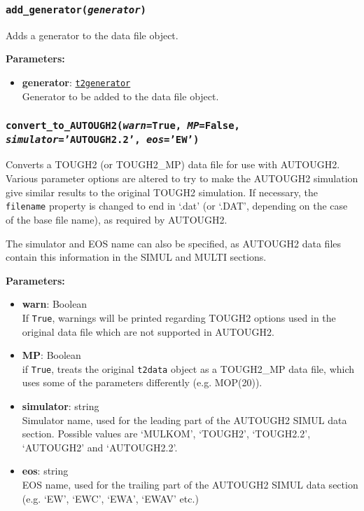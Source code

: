 \begin{snugshade}
\subsubsection{\texttt{add\_generator(\emph{generator})}}
\end{snugshade}
\label{sec:t2data:add_generator}

Adds a generator to the data file object.

\textbf{Parameters:}
\begin{itemize}
\item \textbf{generator}: \hyperref[t2generatorobjects]{\texttt{t2generator}}\\
  Generator to be added to the data file object.
\end{itemize}

\begin{snugshade}
\subsubsection{\texttt{convert\_to\_AUTOUGH2(\emph{warn}=True, \emph{MP}=False, \emph{simulator}='AUTOUGH2.2',\
    \emph{eos}='EW')}}
\end{snugshade}
\label{sec:t2data:convert_to_AUTOUGH2}

Converts a TOUGH2 (or TOUGH2\_MP) data file for use with AUTOUGH2.  Various parameter options are altered to try to make the AUTOUGH2 simulation give similar results to the original TOUGH2 simulation.  If necessary, the \texttt{filename} property is changed to end in `.dat' (or `.DAT', depending on the case of the base file name), as required by AUTOUGH2.

The simulator and EOS name can also be specified, as AUTOUGH2 data files contain this information in the SIMUL and MULTI sections.

\textbf{Parameters:}
\begin{itemize}
\item \textbf{warn}: Boolean\\
  If \texttt{True}, warnings will be printed regarding TOUGH2 options used in the original data file which are not supported in AUTOUGH2.
\item \textbf{MP}: Boolean\\
  if \texttt{True}, treats the original \texttt{t2data} object as a TOUGH2\_MP data file, which uses some of the parameters differently (e.g. MOP(20)).
\item \textbf{simulator}: string\\
  Simulator name, used for the leading part of the AUTOUGH2 SIMUL data section.  Possible values are `MULKOM', `TOUGH2', `TOUGH2.2', `AUTOUGH2' and `AUTOUGH2.2'.
\item \textbf{eos}: string\\
  EOS name, used for the trailing part of the AUTOUGH2 SIMUL data section (e.g. `EW', `EWC', `EWA', `EWAV' etc.)
\end{itemize}

